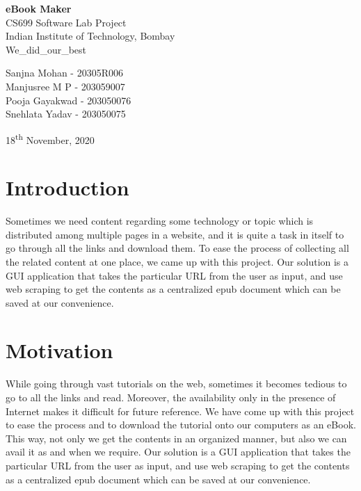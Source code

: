 \documentclass[12pt,a4paper,titlepage]{article}
\date{}
\begin{document}
\begin{titlepage}
\vspace*{\fill}
\begin{center}
\centering
\begin{Huge}
{\textbf{\bfseries eBook Maker\\}}
\huge CS699 Software Lab Project\\
\LARGE Indian Institute of Technology, Bombay\vspace{8mm}\\
We\_did\_our\_best\vspace{4mm}\\
\end{Huge}
\begin{large}
{Sanjna Mohan - 20305R006\\
Manjusree M P - 203059007\\
Pooja Gayakwad - 203050076\\
Snehlata Yadav - 203050075\\}
\end{large}
\vspace{0.5cm}
\begin{Large}
18\textsuperscript{th} November, 2020
\end{Large}
\author{}
\end{center}
\vspace*{\fill}
\end{titlepage}

\tableofcontents

\newpage

\section{\textbf{Introduction}}
Sometimes we need content regarding some technology or topic which is distributed among multiple pages in a website, and it is quite a task in itself to go through all the links and download them. To ease the process of collecting all the related content at one place, we came up with this project. Our solution is a GUI application that takes the particular URL from the user as input, and use web scraping to get the contents as a centralized epub document which can be saved at our convenience.
\section{\textbf{Motivation}}
While going through vast tutorials on the web, sometimes it becomes tedious to go to all the links and read.
Moreover, the availability only in the presence of Internet makes it difficult for future reference.
We have come up with this project to ease the process and to download the tutorial onto our computers as an eBook.
This way, not only we get the contents in an organized manner, but also we can avail it as and when we require.
Our solution is a GUI application that takes the particular URL from the user as input, and use web scraping to get the contents as a centralized epub document which can be saved at our convenience.
\end{document}
